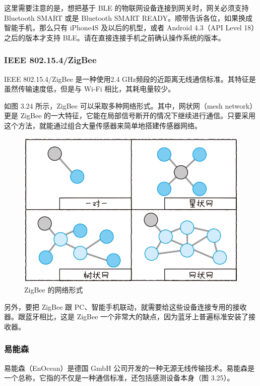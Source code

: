 \documentclass[12pt,UTF8]{ctexbook}
\begin{document}
这里需要注意的是，想把基于 BLE 的物联网设备连接到网关时，网关必须支持 Bluetooth SMART 或是 Bluetooth SMART READY。顺带告诉各位，如果换成智能手机，那么只有 iPhone4S  及以后的机型，或者 Android 4.3（API Level 18）之后的版本才支持 BLE。请在直接连接手机之前确认操作系统的版本。

\subsubsection{IEEE 802.15.4/ZigBee}

IEEE 802.15.4/ZigBee 是一种使用2.4 GHz频段的近距离无线通信标准。其特征是虽然传输速度低，但是与 Wi-Fi 相比，其耗电量较少。

如图 3.24 所示，ZigBee 可以采取多种网络形式。其中，网状网（mesh network）更是 ZigBee 的一大特征，它能在局部信号断开的情况下继续进行通信。只要采用这个方法，就能通过组合大量传感器来简单地搭建传感器网络。

\begin{figure}[htbp]
	\centering
	\includegraphics[width=1\linewidth]{75}
	\caption{ZigBee 的网络形式}
	\label{fig:1}
\end{figure}

另外，要把 ZigBee 跟 PC、智能手机联动，就需要给这些设备连接专用的接收器。跟蓝牙相比，这是 ZigBee 一个非常大的缺点，因为蓝牙上普遍标准安装了接收器。

\subsubsection{易能森}

易能森（EnOcean）是德国 GmbH 公司开发的一种无源无线传输技术。易能森是一个总称，它指的不仅是一种通信标准，还包括感测设备本身（图 3.25）。
\end{document}
